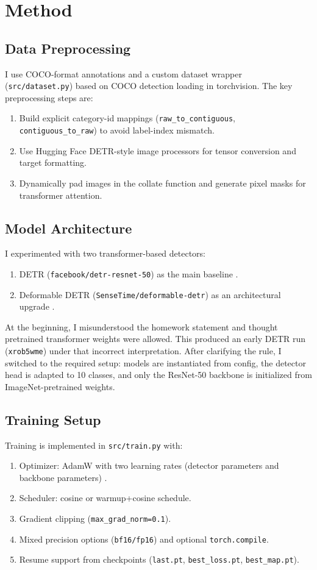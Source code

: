 \section{Method}
\subsection{Data Preprocessing}
I use COCO-format annotations and a custom dataset wrapper (\texttt{src/dataset.py}) based on COCO detection loading in torchvision.
The key preprocessing steps are:
\begin{enumerate}
    \item Build explicit category-id mappings (\texttt{raw\_to\_contiguous}, \texttt{contiguous\_to\_raw}) to avoid label-index mismatch.
    \item Use Hugging Face DETR-style image processors for tensor conversion and target formatting.
    \item Dynamically pad images in the collate function and generate pixel masks for transformer attention.
\end{enumerate}

\subsection{Model Architecture}
I experimented with two transformer-based detectors:
\begin{enumerate}
    \item DETR (\texttt{facebook/detr-resnet-50}) as the main baseline \cite{carion2020end}.
    \item Deformable DETR (\texttt{SenseTime/deformable-detr}) as an architectural upgrade \cite{zhu2021deformabledetr}.
\end{enumerate}
At the beginning, I misunderstood the homework statement and thought pretrained transformer weights were allowed.
This produced an early DETR run (\texttt{xrob5wme}) under that incorrect interpretation.
After clarifying the rule, I switched to the required setup: models are instantiated from config, the detector head is adapted to 10 classes, and only the ResNet-50 backbone is initialized from ImageNet-pretrained weights.

\subsection{Training Setup}
Training is implemented in \texttt{src/train.py} with:
\begin{enumerate}
    \item Optimizer: AdamW with two learning rates (detector parameters and backbone parameters) \cite{loshchilov2019decoupled}.
    \item Scheduler: cosine or warmup+cosine schedule.
    \item Gradient clipping (\texttt{max\_grad\_norm=0.1}).
    \item Mixed precision options (\texttt{bf16/fp16}) and optional \texttt{torch.compile}.
    \item Resume support from checkpoints (\texttt{last.pt}, \texttt{best\_loss.pt}, \texttt{best\_map.pt}).
\end{enumerate}

